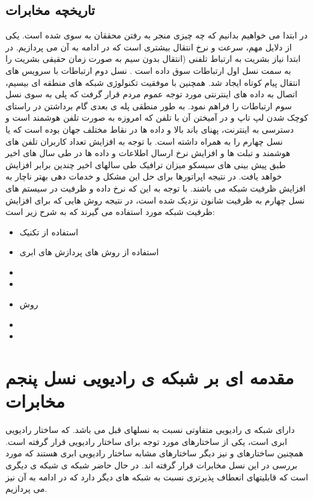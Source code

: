 \subsection{تاریخچه مخابرات}
در ابتدا می خواهیم بدانیم که چه چیزی منجر به رفتن محققان به سوی   شده است. یکی از دلایل مهم، سرعت و نرخ انتقال بیشتری است که در ادامه به آن می پردازیم.
در ابتدا نیاز بشریت به ارتباط تلفنی (انتقال بدون سیم به صورت زمان حقیقی  بشریت را به سمت نسل اول ارتباطات  سوق داده است . نسل دوم ارتباطات  با سرویس های انتقال پیام کوتاه ایجاد شد. همچنین با موفقیت تکنولوژی شبکه های منطقه ای بیسیم، اتصال به داده های اینترنتی مورد توجه عموم مردم قرار گرفت که پلی به سوی نسل سوم ارتباطات  را فراهم نمود. به طور منطقی پله ی بعدی گام برداشتن در راستای کوچک شدن لپ تاپ و در آمیختن آن با تلفن که امروزه به صورت تلفن هوشمند است و دسترسی به  اینترنت، پهنای باند بالا و داده ها در نقاط مختلف جهان بوده است که  یا نسل چهارم را به همراه داشته است.
با توجه به افزایش تعداد کاربران تلفن های
هوشمند و تبلت ها و افزایش نرخ ارسال اطلاعات و داده ها در طی سال
های اخیر طبق پیش بینی های سیسکو میزان ترافیک  طی سالهای اخیر
  چندین برابر افزایش خواهد یافت.
در نتیجه اپراتورها برای حل این مشکل و خدمات
دهی بهتر ناچار به افزایش ظرفیت شبکه می باشند. با توجه
به این که نرخ داده و ظرفیت در سیستم های نسل چهارم به ظرفیت
شانون نزدیک شده است، در نتیجه روش هایی که برای
افزایش ظرفیت شبکه مورد استفاده می گیرند که به شرح زیر است:
\begin{itemize}
\item
استفاده از تکنیک 
\item
استفاده از روش های پردازش های ابری
\item
{}
\item
{}
\item
روش 
\item
{}
\item 
{}
\end{itemize}
\section{مقدمه ای بر شبکه ی رادیویی نسل پنجم مخابرات}
دارای شبکه ی رادیویی متفاوتی نسبت به نسلهای قبل می باشد.   که ساختار رادیویی ابری است، یکی از ساختارهای مورد توجه برای ساختار رادیویی قرار گرفته است. همچنین ساختارهای  و   نیز دیگر ساختارهای مشابه ساختار رادیویی ابری هستند که مورد بررسی در این نسل مخابرات قرار گرفته اند. در حال حاضر شبکه ی  شبکه ی دیگری است که قابلیتهای انعطاف پذیرتری نسبت به شبکه های دیگر دارد که در ادامه به آن نیز می پردازیم.
